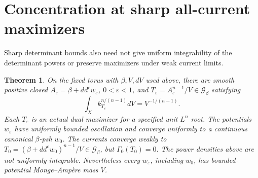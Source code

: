 \documentclass[11pt]{article}
\newcommand{\ddc}{dd^c}
\newcommand{\Ga}{\mathcal G}
\newtheorem{theorem}{Theorem}
\theoremstyle{remark}\newtheorem{remark}[theorem]{Remark}
\begin{document}
\section{Concentration at sharp all-current maximizers}
Sharp determinant bounds also need not give uniform integrability of
the determinant powers or preserve maximizers under weak current limits.
\begin{theorem}\label{th:concentration}
On the fixed torus with $\beta,V,dV$ used above, there are smooth
positive closed $A_\varepsilon=\beta+\ddc w_\varepsilon$,
$0<\varepsilon<1$, and $T_\varepsilon=A_\varepsilon^{n-1}/V
\in\Ga_\beta$ satisfying
\[
 \int_X k_{T_\varepsilon}^{n/(n-1)}dV=V^{-1/(n-1)}.
\]
Each $T_\varepsilon$ is an actual dual maximizer for a specified
unit $L^n$ root. The potentials $w_\varepsilon$ have uniformly
bounded oscillation and converge uniformly to a continuous canonical
$\beta$-psh $w_0$. The currents converge weakly to
$T_0=(\beta+\ddc w_0)^{n-1}/V\in\Ga_\beta$, but
$\Gamma_0(T_0)=0$. The power densities above are not uniformly
integrable. Nevertheless every $w_\varepsilon$, including $w_0$,
has bounded-potential Monge--Amp\`ere mass $V$.
\end{theorem}
\end{document}
